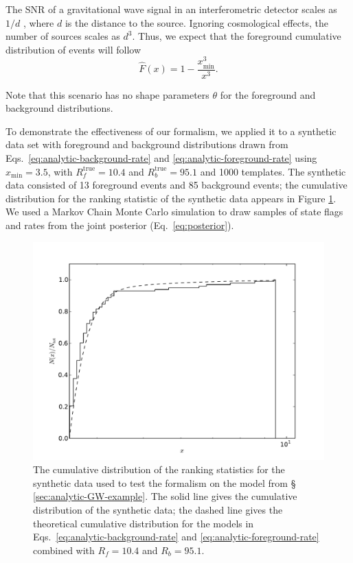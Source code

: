 \documentclass[aps,prd]{revtex4-1}
\newcommand{\xmin}{x_\mathrm{min}}
\begin{document}
The SNR of a gravitational wave signal in an interferometric detector
scales as $1/d$ \citep{Finn1992}, where $d$ is the distance to the
source.  Ignoring cosmological effects, the number of sources scales
as $d^3$.  Thus, we expect that the foreground cumulative distribution
of events will follow
\begin{equation}
  \label{eq:analytic-foreground-rate}
  \hat{F}(x) = 1 - \frac{\xmin^3}{x^3}.
\end{equation}

Note that this scenario has no shape parameters $\theta$ for the
foreground and background distributions.

To demonstrate the effectiveness of our formalism, we applied it to a
synthetic data set with foreground and background distributions drawn
from Eqs.~\eqref{eq:analytic-background-rate} and
\eqref{eq:analytic-foreground-rate} using $x_\mathrm{min} = 3.5$, with
$R_f^\mathrm{true} = 10.4$ and $R_b^\mathrm{true} = 95.1$ and 1000
templates.  The synthetic data consisted of 13 foreground events and
85 background events; the cumulative distribution for the ranking
statistic of the synthetic data appears in Figure
\ref{fig:analytic-data-cumulative}.  We used a Markov Chain Monte
Carlo simulation to draw samples of state flags and rates from the
joint posterior (Eq.~\eqref{eq:posterior}).

\begin{figure}
  \includegraphics[width=\columnwidth]{data}
  \caption{\label{fig:analytic-data-cumulative} The cumulative
    distribution of the ranking statistics for the synthetic data used
    to test the formalism on the model from \S
    \ref{sec:analytic-GW-example}.  The solid line gives the
    cumulative distribution of the synthetic data; the dashed line
    gives the theoretical cumulative distribution for the models in
    Eqs.~\eqref{eq:analytic-background-rate} and
    \eqref{eq:analytic-foreground-rate} combined with $R_f = 10.4$ and
    $R_b = 95.1$.}
\end{figure}
\end{document}
